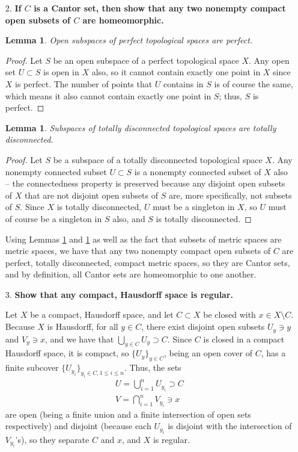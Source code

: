 \documentclass[a4paper,12pt]{article}
\newtheorem{lemma}[theorem]{Lemma}
\begin{document}
\begin{enumerate}
    \item[2.]
        \boldmath\textbf{If $C$ is a Cantor set, then show that any two nonempty compact open subsets of $C$ are homeomorphic.
        }\unboldmath \par
        \begin{lemma} \label{lem:perfect}
            Open subspaces of perfect topological spaces are perfect.
        \end{lemma}
        \begin{proof}
            Let $S$ be an open subspace of a perfect topological space $X$. Any open set $U \subset S$ is open in $X$ also, so it cannot contain exactly one point in $X$ since $X$ is perfect. The number of points that $U$ contains in $S$ is of course the same, which means it also cannot contain exactly one point in $S$; thus, $S$ is perfect.
        \end{proof}
        \begin{lemma} \label{lem:disconnected}
            Subspaces of totally disconnected topological spaces are totally disconnected.
        \end{lemma}
        \begin{proof}
            Let $S$ be a subspace of a totally disconnected topological space $X$. Any nonempty connected subset $U \subset S$ is a nonempty connected subset of $X$ also -- the connectedness property is preserved because any disjoint open subsets of $X$ that are not disjoint open subsets of $S$ are, more specifically, not subsets of $S$. Since $X$ is totally disconnected, $U$ must be a singleton in $X$, so $U$ must of course be a singleton in $S$ also, and $S$ is totally disconnected.
        \end{proof}
        Using Lemmas \ref{lem:perfect} and \ref{lem:disconnected} as well as the fact that subsets of metric spaces are metric spaces, we have that any two nonempty compact open subsets of $C$ are perfect, totally disconnected, compact metric spaces, so they are Cantor sets, and by definition, all Cantor sets are homeomorphic to one another.

    \item[3.]
        \boldmath\textbf{Show that any compact, Hausdorff space is regular.
        }\unboldmath \par
        Let $X$ be a compact, Hausdorff space, and let $C \subset X$ be closed with $x \in X \setminus C$. Because $X$ is Hausdorff, for all $y \in C$, there exist disjoint open subsets $U_y \ni y$ and $V_y \ni x$, and we have that $\bigcup_{y \in C} U_y \supset C$. Since $C$ is closed in a compact Hausdorff space, it is compact, so $\{ U_y \}_{y \in C}$, being an open cover of $C$, has a finite subcover $\{ U_{y_i} \}_{y_i \in C, 1 \leq i \leq n}$. Thus, the sets
        \begin{gather*}
            U = \bigcup_{i = 1}^n U_{y_i} \supset C \\
            V = \bigcap_{i = 1}^n V_{y_i} \ni x
        \end{gather*}
        are open (being a finite union and a finite intersection of open sets respectively) and disjoint (because each $U_{y_i}$ is disjoint with the intersection of $V_{y_i}$'s), so they separate $C$ and $x$, and $X$ is regular.


\end{enumerate}
\end{document}
